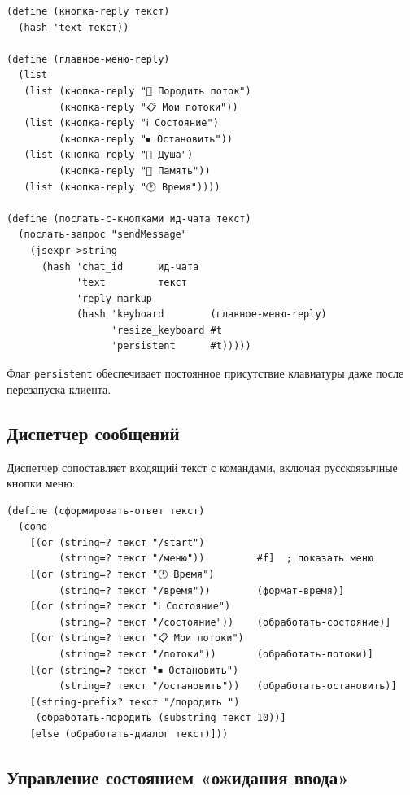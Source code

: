 \documentclass[11pt,a4paper]{article}
\begin{document}
\begin{lstlisting}[language=Racket, caption={Reply-клавиатура (main.rkt)}]
(define (кнопка-reply текст)
  (hash 'text текст))

(define (главное-меню-reply)
  (list
   (list (кнопка-reply "🔧 Породить поток")
         (кнопка-reply "📋 Мои потоки"))
   (list (кнопка-reply "ℹ️ Состояние")
         (кнопка-reply "⏹ Остановить"))
   (list (кнопка-reply "🧠 Душа")
         (кнопка-reply "💾 Память"))
   (list (кнопка-reply "🕐 Время"))))

(define (послать-с-кнопками ид-чата текст)
  (послать-запрос "sendMessage"
    (jsexpr->string
      (hash 'chat_id      ид-чата
            'text         текст
            'reply_markup
            (hash 'keyboard        (главное-меню-reply)
                  'resize_keyboard #t
                  'persistent      #t)))))
\end{lstlisting}

Флаг \texttt{persistent} обеспечивает постоянное присутствие клавиатуры даже
после перезапуска клиента.

\subsection{Диспетчер сообщений}

Диспетчер сопоставляет входящий текст с командами, включая русскоязычные кнопки меню:

\begin{lstlisting}[language=Racket, caption={Диспетчер команд}]
(define (сформировать-ответ текст)
  (cond
    [(or (string=? текст "/start")
         (string=? текст "/меню"))         #f]  ; показать меню
    [(or (string=? текст "🕐 Время")
         (string=? текст "/время"))        (формат-время)]
    [(or (string=? текст "ℹ️ Состояние")
         (string=? текст "/состояние"))    (обработать-состояние)]
    [(or (string=? текст "📋 Мои потоки")
         (string=? текст "/потоки"))       (обработать-потоки)]
    [(or (string=? текст "⏹ Остановить")
         (string=? текст "/остановить"))   (обработать-остановить)]
    [(string-prefix? текст "/породить ")
     (обработать-породить (substring текст 10))]
    [else (обработать-диалог текст)]))
\end{lstlisting}

\subsection{Управление состоянием «ожидания ввода»}
\end{document}
